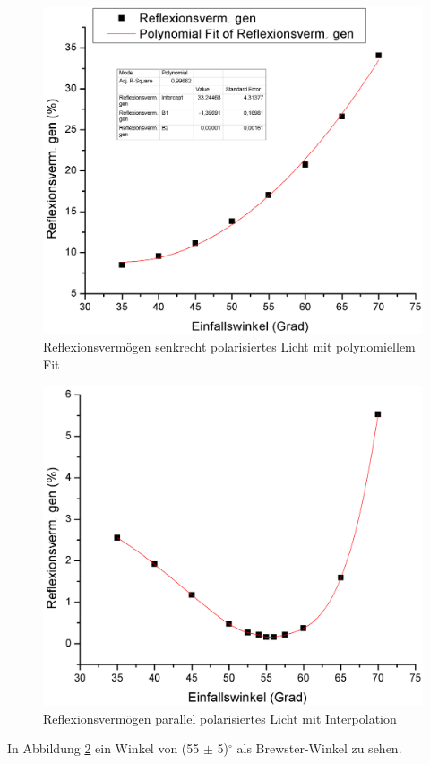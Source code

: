 \documentclass[12pt,a4paper]{article}
\begin{document}
\begin{multicols}{2}
\begin{figure}[H]
	\centering
	\includegraphics[scale=0.28]{./data/R_S_Plot.png}
	\caption{Reflexionsvermögen senkrecht polarisiertes Licht mit polynomiellem Fit}
	\label{fig:r_s_plot}
\end{figure}

\begin{figure}[H]
	\centering
	\includegraphics[scale=0.28]{./data/R_P_Plot.png}
	\caption{Reflexionsvermögen parallel polarisiertes Licht mit Interpolation}
	\label{fig:r_p_plot}
\end{figure}
In Abbildung \ref{fig:r_p_plot} ein Winkel von (55 $\pm$ 5)$^\circ$ als Brewster-Winkel zu sehen.





\end{multicols}
\end{document}
